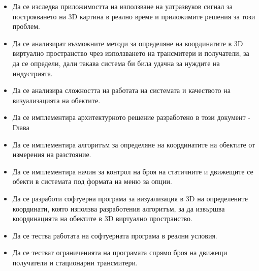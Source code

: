 \begin{itemize}
    \item Да се изследва приложимостта на използване на ултразвуков сигнал за построяването на 3D картина в реално време и приложимите решения за този проблем.
      
    \item Да се анализират възможните методи за определяне на координатите в 3D виртуално пространство чрез използването на трансмитери и получатели, за да се определи, дали такава система би била удачна за нуждите на индустрията.
    
    \item Да се анализира сложността на работата на системата и качеството на визуализацията на обектите.
    
    \item Да се имплементира архитектурното решение разработено в този документ - Глава 
    
    \item Да се имплементира алгоритъм за определяне на координатите на обектите от измерения на разстояние.
    
    \item Да се имплементира начин за контрол на броя на статичните и движещите се обекти в системата под формата на меню за опции.
    
    \item Да се разработи софтуерна програма за визуализация в 3D на определените координати, която използва разработения алгоритъм, за да извършва координацията на обектите в 3D виртуално пространство.
    
    \item Да се тества работата на софтуерната програма в реални условия.
    
    \item Да се тестват ограниченията на програмата спрямо броя на движещи получатели и стационарни трансмитери.
\end{itemize}